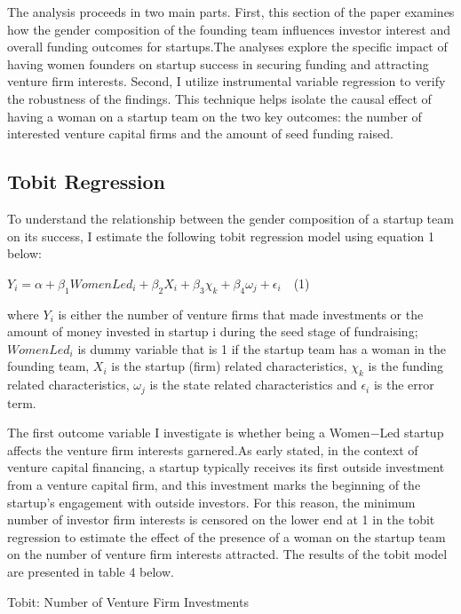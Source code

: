 The analysis proceeds in two main parts. First, this section of the paper examines how the gender composition of the founding team influences investor interest and overall funding outcomes for startups.The analyses explore the specific impact of having women founders on startup success in securing funding and attracting venture firm interests. Second, I utilize instrumental variable regression to verify the robustness of the findings. This technique helps isolate the causal effect of having a woman on a startup team on the two key outcomes: the number of interested venture capital firms and the amount of seed funding raised.

\subsection{Tobit Regression}
\hspace *{0mm} To understand the relationship between the gender composition of a startup team on its success, I estimate the following tobit regression model using equation 1 below: 

\begin{center}
$Y_{i}=\alpha +\beta_1WomenLed_i+\beta_2X_{i} + \beta_{3}\chi_{k} + \beta_4\omega_{j}  + \epsilon_{i} \quad $(1)$ $
\end{center}
        
\noindent where $Y_{i}$ is either the number of venture firms that made investments or the amount of money invested in startup i during the seed stage of fundraising;  $WomenLed_i$ is dummy variable that is 1 if the startup team has a woman in the founding team, $X_{i}$ is the startup (firm) related characteristics, $\chi_{k}$ is the funding related characteristics, $\omega_{j} $ is the state related characteristics and $\epsilon_{i}$ is the error term. 

The first outcome variable I investigate is whether being a Women$-$Led startup affects the venture firm interests garnered.As early stated, in the context of venture capital financing, a startup typically receives its first outside investment from a venture capital firm, and this investment marks the beginning of the startup's engagement with outside investors. For this reason, the minimum number of investor firm interests is censored on the lower end at 1 in the tobit regression to  estimate the effect of the presence of a woman on the startup team on the number of venture firm interests attracted. The results of the tobit model are presented in table 4 below. 


\begin{table}[H]
 \captionsetup{justification=raggedright,singlelinecheck=false}
    \caption{Tobit: Number of Venture Firm Investments}
        
\end{table}

